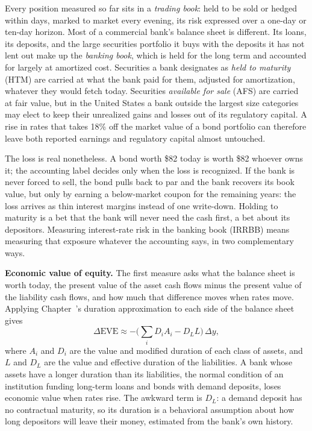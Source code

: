 \documentclass[../ai_in_finance]{subfiles}
\begin{document}
Every position measured so far sits in a \emph{trading book}: held to be sold or hedged within days, marked to market every evening, its risk expressed over a one-day or ten-day horizon. Most of a commercial bank's balance sheet is different. Its loans, its deposits, and the large securities portfolio it buys with the deposits it has not lent out make up the \emph{banking book}, which is held for the long term and accounted for largely at amortized cost.
Securities a bank designates as \emph{held to maturity} (HTM) are carried at what the bank paid for them, adjusted for amortization, whatever they would fetch today. Securities \emph{available for sale} (AFS) are carried at fair value, but in the United States a bank outside the largest size categories may elect to keep their unrealized gains and losses out of its regulatory capital. A rise in rates that takes 18\% off the market value of a bond portfolio can therefore leave both reported earnings and regulatory capital almost untouched.

The loss is real nonetheless. A bond worth \$82 today is worth \$82 whoever owns it; the accounting label decides only when the loss is recognized. If the bank is never forced to sell, the bond pulls back to par and the bank recovers its book value, but only by earning a below-market coupon for the remaining years: the loss arrives as thin interest margins instead of one write-down. Holding to maturity is a bet that the bank will never need the cash first, a bet about its depositors. Measuring interest-rate risk in the banking book (IRRBB) means measuring that exposure whatever the accounting says, in two complementary ways.

\textbf{Economic value of equity.} The first measure asks what the balance sheet is worth today, the present value of the asset cash flows minus the present value of the liability cash flows, and how much that difference moves when rates move. Applying Chapter~'s duration approximation to each side of the balance sheet gives
\begin{equation}
\label{eq:marketrisk-delta-eve}
\Delta \text{EVE} \approx -\Big(\sum_i D_i A_i - D_L L\Big)\,\Delta y,
\end{equation}
where $A_i$ and $D_i$ are the value and modified duration of each class of assets, and $L$ and $D_L$ are the value and effective duration of the liabilities. A bank whose assets have a longer duration than its liabilities, the normal condition of an institution funding long-term loans and bonds with demand deposits, loses economic value when rates rise. The awkward term is $D_L$: a demand deposit has no contractual maturity, so its duration is a behavioral assumption about how long depositors will leave their money, estimated from the bank's own history.
\end{document}
